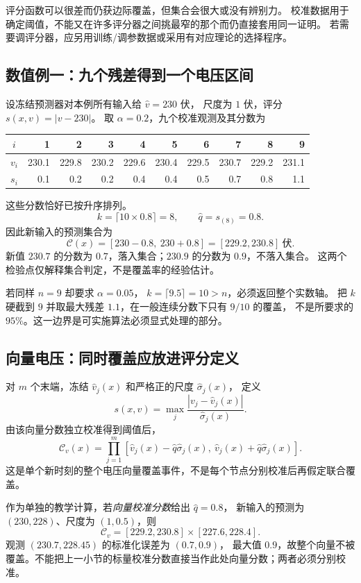 评分函数可以很差而仍获边际覆盖，但集合会很大或没有辨别力。
校准数据用于确定阈值，不能又在许多评分器之间挑最窄的那个而仍直接套用同一证明。
若需要调评分器，应另用训练/调参数据或采用有对应理论的选择程序。

\subsection{数值例一：九个残差得到一个电压区间}

设冻结预测器对本例所有输入给 $\widehat v=230$ 伏，
尺度为 $1$ 伏，评分 $s(x,v)=|v-230|$。
取 $\alpha=0.2$，九个校准观测及其分数为
\begin{center}
\begin{tabular}{crrrrrrrrr}
\toprule
$i$ &1&2&3&4&5&6&7&8&9\\
\midrule
$v_i$ &230.1&229.8&230.2&229.6&230.4&229.5&230.7&229.2&231.1\\
$s_i$ &0.1&0.2&0.2&0.4&0.4&0.5&0.7&0.8&1.1\\
\bottomrule
\end{tabular}
\end{center}
这些分数恰好已按升序排列。
\[
 k=\lceil10\times0.8\rceil=8,\qquad
 \widehat q=s_{(8)}=0.8.
\]
因此新输入的预测集合为
\[
 \mathcal C(x)=[230-0.8,\ 230+0.8]=[229.2,230.8]\ \text{伏}.
\]
新值 $230.7$ 的分数为 $0.7$，落入集合；$230.9$ 的分数为 $0.9$，不落入集合。
这两个检验点仅解释集合判定，不是覆盖率的经验估计。

若同样 $n=9$ 却要求 $\alpha=0.05$，
$k=\lceil9.5\rceil=10>n$，必须返回整个实数轴。
把 $k$ 硬截到 $9$ 并取最大残差 $1.1$，在一般连续分数下只有 $9/10$ 的覆盖，
不是所要求的 $95\%$。这一边界是可实施算法必须显式处理的部分。

\subsection{向量电压：同时覆盖应放进评分定义}

对 $m$ 个末端，冻结 $\widehat v_j(x)$ 和严格正的尺度 $\widehat\sigma_j(x)$，
定义
\[
 s(x,v)=\max_j\frac{|v_j-\widehat v_j(x)|}{\widehat\sigma_j(x)}.
\]
由该向量分数独立校准得到阈值后，
\[
 \mathcal C_v(x)=
 \prod_{j=1}^m
 [\widehat v_j(x)-\widehat q\widehat\sigma_j(x),\
  \widehat v_j(x)+\widehat q\widehat\sigma_j(x)].
\]
这是单个新时刻的整个电压向量覆盖事件，不是每个节点分别校准后再假定联合覆盖。

作为单独的教学计算，若\emph{向量校准分数}给出 $\widehat q=0.8$，
新输入的预测为 $(230,228)$、尺度为 $(1,0.5)$，则
\[
 \mathcal C_v=[229.2,230.8]\times[227.6,228.4].
\]
观测 $(230.7,228.45)$ 的标准化误差为 $(0.7,0.9)$，
最大值 $0.9$，故整个向量不被覆盖。不能把上一小节的标量校准分数直接当作此处向量分数；两者必须分别校准。


